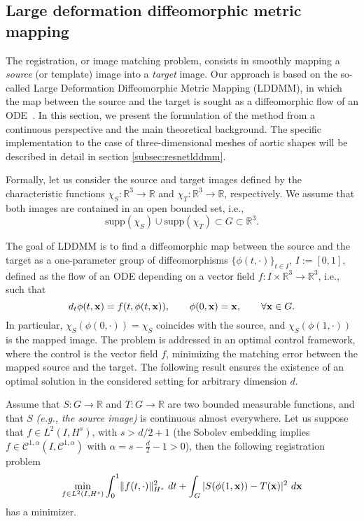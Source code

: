 \subsection{Large deformation diffeomorphic metric mapping}\label{ssec:resnet-lddmm-intro}
The registration, or image matching problem, consists in smoothly mapping a \textit{source} (or template) image into a \textit{target} image. 
Our approach is based on the so-called Large Deformation Diffeomorphic Metric Mapping (LDDMM), in which
the map between the source and the target is sought as a diffeomorphic flow of an ODE~\cite{bruveris2017completeness,dupuis1998variational}.
In this section, we present the formulation of the method from a continuous perspective and the main theoretical background. 
The specific implementation to the case of three-dimensional
meshes of aortic shapes will be described in detail in section \ref{subsec:resnetlddmm}.

Formally, let us consider the source and target images defined by the characteristic functions $\chi_S:\mathbb{R}^3\rightarrow\mathbb{R}$ and $\chi_T:\mathbb{R}^3\rightarrow\mathbb{R}$, respectively.
We assume that both images are contained in an open bounded set, i.e., 
\begin{equation*}
\text{supp}(\chi_S)\cup\text{supp}(\chi_T)\subset G\subset\mathbb{R}^3.
\end{equation*}

The goal of LDDMM is to find a diffeomorphic map between the source and the target as a one-parameter group of diffeomorphisms  $\{\phi(t, \cdot)\}_{t\in I}$, $I :=[0,1]$, defined
as the flow of an ODE depending on a vector field $f:I\times\mathbb{R}^3\rightarrow\mathbb{R}^3$, i.e., such that
\begin{equation}\label{eq:phi_t_lddmm}
  d_t \phi(t, \mathbf{x}) = f(t, \phi(t, \mathbf{x})),\qquad \phi(0, \mathbf{x}) = \mathbf{x},\qquad\forall\mathbf{x}\in G.
\end{equation}
In particular, $\chi_S\left(\phi(0,\cdot)\right) = \chi_S$ coincides with the source, and  $\chi_S\left(\phi(1,\cdot)\right)$ is the mapped image.
%
The problem is addressed in an optimal control framework, where the control is the vector field $f$, minimizing the matching error between the mapped source and the target.
%
The following result ensures the existence of an optimal solution in the considered setting for arbitrary dimension $d$. 


\begin{theorem}
  \label{def:regpb}
  Assume that $S:G\rightarrow\mathbb{R}$ and $T:G\rightarrow\mathbb{R}$ are two bounded measurable functions, and that $S$ 
 \textit{(e.g., the source image)} is continuous almost everywhere. 
 Let us suppose that $f\in L^2(I, H^s)$, with $s>d/2 + 1$ (the Sobolev embedding implies $f\in \mathcal{C}^{1, \alpha}(I, \mathcal{C}^{1, \alpha})$ with $\alpha=s - \tfrac{d}{2} - 1>0$), then the following registration problem
  \begin{equation}\label{eq:reg_miminization}
    \min_{f\in L^2(I, H^s)} \int_{0}^{1}\lVert f(t, \cdot)\rVert^2_{H^s}\ dt + \int_G |S(\phi(1, \mathbf{x}))-T(\mathbf{x})|^2\ d\mathbf{x}
  \end{equation}
  has a minimizer.
\end{theorem}
%

